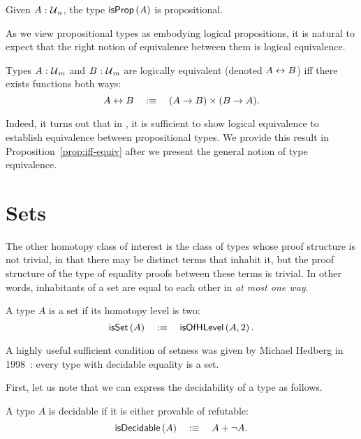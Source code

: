 \begin{prop}
  Given $A\hspace{0.1mm}:\hspace{0.1mm}\mathcal{U}{}_n$, the type $\mathsf{isProp}\left(A\right)$ is propositional.
\end{prop}

As we view propositional types as embodying logical propositions, it is natural to
expect that the right notion of equivalence between them is logical equivalence.

\begin{defn}\label{defn:iff}
  Types $A\hspace{0.1mm}:\hspace{0.1mm}\mathcal{U}{}_m$ and $B\hspace{0.1mm}:\hspace{0.1mm}\mathcal{U}{}_m$ are logically equivalent
  (denoted $A \leftrightarrow B$) iff there exists functions both ways:
  \begin{equation*}
    A \leftrightarrow B \quad:\equiv\quad (A \rightarrow B) \times (B \rightarrow A).
  \end{equation*}
\end{defn}

Indeed, it turns out that in \UF{}, it is sufficient to show logical equivalence to
establish equivalence between propositional types. We provide this result in
Proposition~\ref{prop:iff-equiv} after we present the general notion of type equivalence.

\section{Sets}

The other homotopy class of interest is the class of types whose proof structure is not
trivial, in that there may be distinct terms that inhabit it, but the proof structure of
the type of equality proofs between these terms is trivial. In other words, inhabitants of
a set are equal to each other in \emph{at most one way}.

\begin{defn}[Set]\label{defn:hset}
  A type $A$ is a set if its homotopy level is two:
  \begin{equation*}
    \mathsf{isSet}\left(A\right) \quad:\equiv\quad \mathsf{isOfHLevel}\left(A, 2\right).
  \end{equation*}
\end{defn}

A highly useful sufficient condition of setness was given by Michael Hedberg in
1998~\cite{hedberg}: every type with decidable equality is a set.

First, let us note that we can express the decidability of a type as follows.
\begin{defn}[Decidability]
  A type $A$ is decidable if it is either provable of refutable:
  \begin{equation*}
    \mathsf{isDecidable}\left(A\right) \quad:\equiv\quad A + \neg A.
  \end{equation*}
\end{defn}

